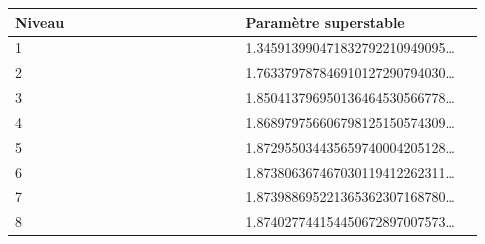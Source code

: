 \begingroup\small
\begin{center}\begin{tabular}{p{0.465\linewidth}p{0.465\linewidth}}
\hline
Niveau & Paramètre superstable \\
\hline
1 & 1.345913990471832792210949095… \\
2 & 1.763379787846910127290794030… \\
3 & 1.850413796950136464530566778… \\
4 & 1.868979756606798125150574309… \\
5 & 1.872955034435659740004205128… \\
6 & 1.873806367467030119412262311… \\
7 & 1.873988695221365362307168780… \\
8 & 1.874027744154450672897007573… \\
\hline\end{tabular}\end{center}
\endgroup
